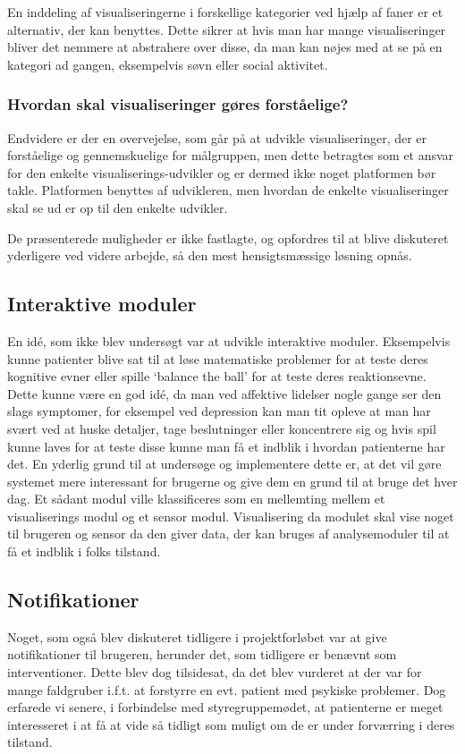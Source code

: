 En inddeling af visualiseringerne i forskellige kategorier ved hjælp af faner er et alternativ, der kan benyttes.
Dette sikrer at hvis man har mange visualiseringer bliver det nemmere at abstrahere over disse, da man kan nøjes med at se på en kategori ad gangen, eksempelvis søvn eller social aktivitet.

\subsubsection{Hvordan skal visualiseringer gøres forståelige?}
Endvidere er der en overvejelse, som går på at udvikle visualiseringer, der er forståelige og gennemskuelige for målgruppen, men dette betragtes som et ansvar for den enkelte visualiserings-udvikler og er dermed ikke noget platformen bør takle.
Platformen benyttes af udvikleren, men hvordan de enkelte visualiseringer skal se ud er op til den enkelte udvikler.

De præsenterede muligheder er ikke fastlagte, og opfordres til at blive diskuteret yderligere ved videre arbejde, så den mest hensigtsmæssige løsning opnås.

\subsection{Interaktive moduler}
En idé, som ikke blev undersøgt var at udvikle interaktive moduler.
Eksempelvis kunne patienter blive sat til at løse matematiske problemer for at teste deres kognitive evner eller spille `balance the ball' for at teste deres reaktionsevne.
Dette kunne være en god idé, da man ved affektive lidelser nogle gange ser den slags symptomer, for eksempel ved depression kan man tit opleve at man har svært ved at huske detaljer, tage beslutninger eller koncentrere sig og hvis spil kunne laves for at teste disse kunne man få et indblik i hvordan patienterne har det. 
En yderlig grund til at undersøge og implementere dette er, at det vil gøre systemet mere interessant for brugerne og give dem en grund til at bruge det hver dag. 
Et sådant modul ville klassificeres som en mellemting mellem et visualiserings modul og et sensor modul.
Visualisering da modulet skal vise noget til brugeren og sensor da den giver data, der kan bruges af analysemoduler til at få et indblik i folks tilstand.

\subsection{Notifikationer}
Noget, som også blev diskuteret tidligere i projektforløbet var at give notifikationer til brugeren, herunder det, som tidligere er benævnt som interventioner.
Dette blev dog tilsidesat, da det blev vurderet at der var for mange faldgruber i.f.t. at forstyrre en evt. patient med psykiske problemer.
Dog erfarede vi senere, i forbindelse med styregruppemødet, at patienterne er meget interesseret i at få at vide så tidligt som muligt om de er under forværring i deres tilstand.

